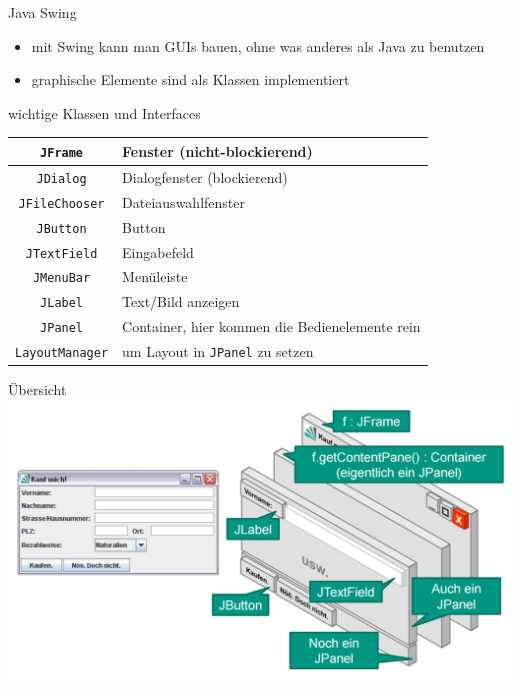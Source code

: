 \documentclass[18pt]{beamer}
\begin{document}
\begin{frame}{Java Swing}
	\begin{itemize}
		\item mit Swing kann man GUIs bauen, ohne was anderes als Java zu benutzen
		\item graphische Elemente sind als Klassen implementiert
	\end{itemize}
	wichtige Klassen und Interfaces
	\begin{table}
		\begin{tabular}{c|l}
			\texttt{JFrame} & Fenster (nicht-blockierend) \\
			\hline
			\texttt{JDialog} & Dialogfenster (blockierend) \\
			\hline
			\texttt{JFileChooser} & Dateiauswahlfenster \\
			\hline
			\texttt{JButton} & Button \\
			\hline
			\texttt{JTextField} & Eingabefeld \\
			\hline
			\texttt{JMenuBar} & Menüleiste \\
			\hline
			\texttt{JLabel} & Text/Bild anzeigen \\
			\hline
			\texttt{JPanel} & Container, hier kommen die Bedienelemente rein\\
			\hline
			\texttt{LayoutManager} & um Layout in \texttt{JPanel} zu setzen 
		\end{tabular}
	\end{table}
\end{frame}

\begin{frame}{Übersicht}
	\centering 
	\includegraphics[scale=0.35]{pics/tut3/swing.png}
\end{frame}
\end{document}

